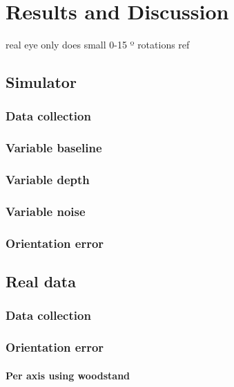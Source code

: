 
\chapter{Results and Discussion}
\label{cha4:results}

real eye only does small 0-15 º rotations ref

\section{Simulator}
\subsection{Data collection}
\subsection{Variable baseline}
\subsection{Variable depth}
\subsection{Variable noise}
\subsection{Orientation error}

\section{Real data}
\subsection{Data collection}
\subsection{Orientation error}
\subsubsection{Per axis using woodstand}

